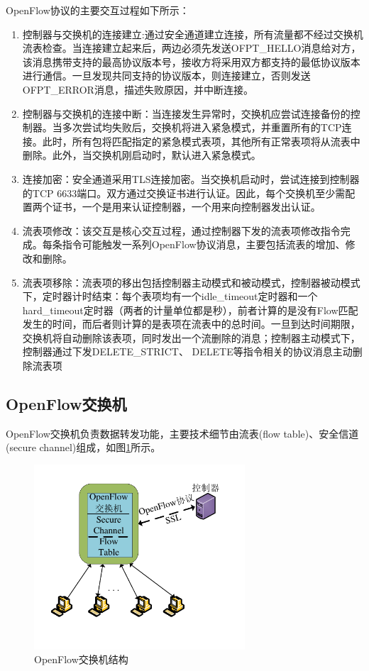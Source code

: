 OpenFlow协议的主要交互过程如下所示：

\begin{enumerate}
\item 控制器与交换机的连接建立:通过安全通道建立连接，所有流量都不经过交换机流表检查。当连接建立起来后，两边必须先发送OFPT\_HELLO消息给对方，该消息携带支持的最高协议版本号，接收方将采用双方都支持的最低协议版本进行通信。一旦发现共同支持的协议版本，则连接建立，否则发送OFPT\_ERROR消息，描述失败原因，并中断连接。
\item 控制器与交换机的连接中断：当连接发生异常时，交换机应尝试连接备份的控制器。当多次尝试均失败后，交换机将进入紧急模式，并重置所有的TCP连接。此时，所有包将匹配指定的紧急模式表项，其他所有正常表项将从流表中删除。此外，当交换机刚启动时，默认进入紧急模式。
\item 连接加密：安全通道采用\gls*{TLS}连接加密。当交换机启动时，尝试连接到控制器的TCP 6633端口。双方通过交换证书进行认证。因此，每个交换机至少需配置两个证书，一个是用来认证控制器，一个用来向控制器发出认证。
\item 流表项修改：该交互是核心交互过程，通过控制器下发的流表项修改指令完成。每条指令可能触发一系列OpenFlow协议消息，主要包括流表的增加、修改和删除。
\item 流表项移除：流表项的移出包括控制器主动模式和被动模式，控制器被动模式下，定时器计时结束：每个表项均有一个idle\_timeout定时器和一个hard\_timeout定时器（两者的计量单位都是秒），前者计算的是没有Flow匹配发生的时间，而后者则计算的是表项在流表中的总时间。一旦到达时间期限，交换机将自动删除该表项，同时发出一个流删除的消息；控制器主动模式下，控制器通过下发DELETE\_STRICT、 DELETE等指令相关的协议消息主动删除流表项
\end{enumerate}

\subsection{OpenFlow交换机}
OpenFlow交换机负责数据转发功能，主要技术细节由流表(flow table)、安全信道(secure channel)组成\cite{openflow-1}，如图\ref{fig:of-switch}所示。

\begin{figure}[!htb]
  \centering
  \includegraphics[width=0.7\textwidth]{logo/of-switch}
  \caption{OpenFlow交换机结构}
  \label{fig:of-switch}
\end{figure}

